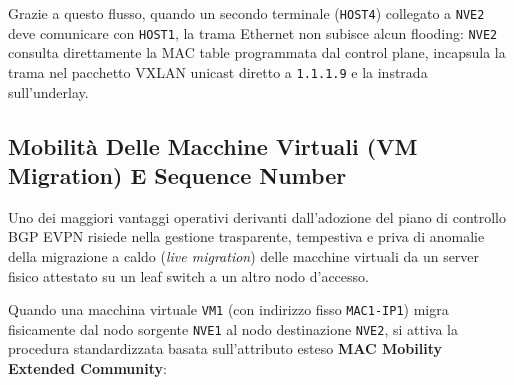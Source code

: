 \documentclass[11pt, a4paper]{article}
\begin{document}
Grazie a questo flusso, quando un secondo terminale (\texttt{HOST4}) collegato a \texttt{NVE2} deve comunicare con \texttt{HOST1}, la trama Ethernet non subisce alcun flooding: \texttt{NVE2} consulta direttamente la MAC table programmata dal control plane, incapsula la trama nel pacchetto VXLAN unicast diretto a \texttt{1.1.1.9} e la instrada sull'underlay.

\subsection{Mobilità Delle Macchine Virtuali (VM Migration) E Sequence Number}

Uno dei maggiori vantaggi operativi derivanti dall'adozione del piano di controllo BGP EVPN risiede nella gestione trasparente, tempestiva e priva di anomalie della migrazione a caldo (\emph{live migration}) delle macchine virtuali da un server fisico attestato su un leaf switch a un altro nodo d'accesso.


Quando una macchina virtuale \texttt{VM1} (con indirizzo fisso \texttt{MAC1-IP1}) migra fisicamente dal nodo sorgente \texttt{NVE1} al nodo destinazione \texttt{NVE2}, si attiva la procedura standardizzata basata sull'attributo esteso \textbf{MAC Mobility Extended Community}:
\end{document}
